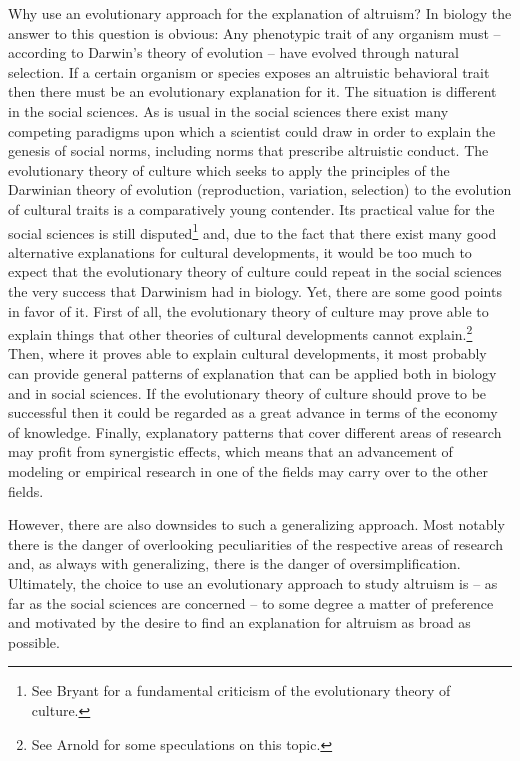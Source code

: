 Why use an evolutionary approach for the explanation of altruism? In biology
the answer to this question is obvious: Any phenotypic trait of any organism
must -- according to Darwin's theory of evolution -- have evolved through
natural selection. If a certain organism or species exposes an altruistic
behavioral trait then there must be an evolutionary explanation for it. The
situation is different in the social sciences.  As is usual in the social
sciences there exist many competing paradigms upon which a scientist could
draw in order to explain the genesis of social norms, including norms that
prescribe altruistic conduct. The evolutionary theory of culture which seeks
to apply the principles of the Darwinian theory of evolution (reproduction,
variation, selection) to the evolution of cultural traits is a comparatively
young contender. Its practical value for the social sciences is still
disputed\footnote{See Bryant \cite[]{bryant:2004} for a fundamental criticism
  of the evolutionary theory of culture.}  and, due to the fact that there exist
many good alternative explanations for cultural developments, it would
be too much to expect that the evolutionary theory of culture could repeat in
the social sciences the very success that Darwinism had in biology. Yet, there are
some good points in favor of it. First of all, the evolutionary theory of
culture may prove able to explain things that other theories of cultural
developments cannot explain.\footnote{See Arnold \cite[]{arnold:2002} for some
  speculations on this topic.} Then, where it proves able to explain cultural
developments, it most probably can provide general patterns of explanation
that can be applied both in biology and in social sciences.
If the evolutionary theory of culture should prove
to be successful then it could be regarded as a great advance in terms of the
economy of knowledge. Finally, explanatory patterns that cover different areas
of research may profit from synergistic effects, which means that an
advancement of modeling or empirical research in one of the fields may carry
over to the other fields.

However, there are also downsides to such a generalizing approach.  Most
notably there is the danger of overlooking peculiarities of the respective
areas of research and, as always with generalizing, there is the danger of
oversimplification. Ultimately, the choice to use an evolutionary approach to
study altruism is -- as far as the social sciences are concerned -- to some
degree a matter of preference and motivated by the desire to find an
explanation for altruism as broad as possible.

